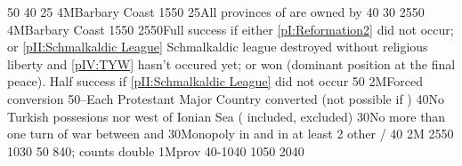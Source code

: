 %
 
%
%
{}{50}{\EU@objNoFrenchVassal}%
%
%
{}{40}{\EU@objNoFrenchItaly}%
%
%
{}{25}{\EU@objSDCF}%
%
\EUobjective4M{Barbary Coast}{\Presidio}%
{15}{50}{\EU@objPresidiosHIS}%
%
%
{}{25}{All provinces of \paysprovincesne are owned by \paysmajeurEspagne}%
%
%
%
{}{40}{\EU@objNoFrenchVassal}%
%
%
{}{30}{\EU@objNoFrenchItaly}%
%
%
{25}{50}{}%
%
\EUobjective4M{Barbary Coast}{\Presidio}%
{15}{50}{\EU@objPresidiosHIS}%
%
%
{25}{50}{Full success if either \ref{pI:Reformation2} did not occur; or
  \ref{pII:Schmalkaldic League} Schmalkaldic league destroyed without
  religious liberty and \ref{pIV:TYW} hasn't occured yet; or
   won (dominant position at the final peace). Half success
  if \ref{pII:Schmalkaldic League} did not occur}%
%
%
%
{}{50}{\EU@objHalfHungary}%
%
\EUobjective2M{Forced conversion}{\MAJ}%
{50}{--}{Each Protestant Major Country converted (not possible if \CATHCO)}%
%
%
{}{40}{No Turkish possesions nor \VASSAL west of Ionian Sea
  ( included, \paystripoli excluded)}%
%
%
{}{30}{No more than one turn of war between  and
  }%
%
%
{}{30}{Monopoly in  and in at least 2 other \CTZ/\STZ}%
%
%
%
{}{40}{\EU@objHalfHungary}%
%
\EUobjective2M{}{}%
{25}{50}{\EU@objGermanEmpire}
%
%
{10}{30}{\EU@objBigAustria}%
%
%
{}{50}{\EU@objPortugalAnnexed}%
%
%
{8}{40}{\EU@objMonopolyZone;  counts double}%
%
%
\EUobjective1M{\payshongrie}{\TUR prov}%
{40-10}{40}{}%
%
%
{10}{50}{\EU@objSpanishNetherlands}%
%
%
{20}{40}{\EU@objSpanishWorld}%
%
%
